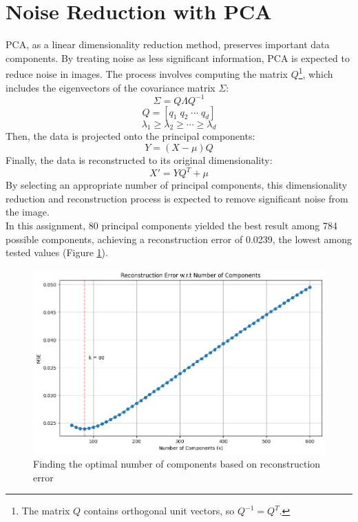 \documentclass[12pt]{article}
\newcommand{\pca}{PCA}
\begin{document}
	\section{Noise Reduction with \pca}\label{sec: pca}
	PCA, as a linear dimensionality reduction method, preserves important data components. By treating noise as less significant information, PCA is expected to reduce noise in images. The process involves computing the matrix \( Q \)\footnote{The matrix \( Q \) contains orthogonal unit vectors, so \( Q^{-1} = Q^T \).}, which includes the eigenvectors of the covariance matrix \( \Sigma \):
	\[
	\Sigma = Q\Lambda Q^{-1}
	\]
	\[
	Q = [q_1 \; q_2 \; \cdots \; q_d]
	\]
	\[
	\lambda_1 \geq \lambda_2 \geq \cdots \geq \lambda_d
	\]
	Then, the data is projected onto the principal components:
	\[
	Y = (X - \mu)Q
	\]
	Finally, the data is reconstructed to its original dimensionality:
	\[
	X' = YQ^T + \mu
	\]
	By selecting an appropriate number of principal components, this dimensionality reduction and reconstruction process is expected to remove significant noise from the image.\\
	In this assignment, 80 principal components yielded the best result among 784 possible components, achieving a reconstruction error of 0.0239, the lowest among tested values (Figure \ref{fig: pca best k}).
	\begin{figure}[H]
		\centering
		\includegraphics[scale=0.6]{figs/best k pca}
		\caption{Finding the optimal number of components based on reconstruction error}
		\label{fig: pca best k}
	\end{figure}
\end{document}

